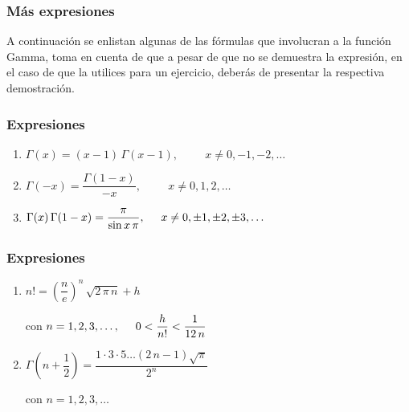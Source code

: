 \documentclass[12pt]{beamer}
\begin{document}
\begin{frame}
\frametitle{Más expresiones}
A continuación se enlistan algunas de las fórmulas que involucran a la función Gamma, \pause toma en cuenta de que a pesar de que no se demuestra la expresión, en el caso de que la utilices para un ejercicio, deberás de presentar la respectiva demostración.
\end{frame}
\begin{frame}
\frametitle{Expresiones}
{%
\begin{enumerate}[<+->]
  \setlength{\itemsep}{1em}
  \item $\Gamma (x) = (x - 1) \, \Gamma(x - 1), \hspace{1cm} x \neq 0, -1, -2, \ldots$ 
  \item $\Gamma (-x) = \dfrac{\Gamma (1- x)}{-x}, \hspace{1cm} x \neq 0, 1, 2, \ldots$
  \item $\Gamma (x) \, \Gamma (1 - x) = \dfrac{\pi}{\sin x \, \pi}, \hspace{0.5cm}  x \neq 0, \pm 1, \pm 2, \pm 3, \ldots$
\seti
\end{enumerate}
}
\end{frame}
\begin{frame}
\frametitle{Expresiones}
{%
\begin{enumerate}[<+->]
  \setlength{\itemsep}{1em}
  \conti
  \item $n! = \left( \dfrac{n}{e} \right)^{n} \, \sqrt{2 \, \pi \, n} + h$
  
  con $n = 1, 2, 3, \ldots, \hspace{0.5cm} 0 < \dfrac{h}{n!} < \dfrac{1}{12 \, n}$
  \item $\Gamma \left(n + \dfrac{1}{2} \right) = \dfrac{1 \cdot 3 \cdot 5 \ldots (2 \, n - 1)\sqrt{\pi}}{2^{n}}$
  
  \vspace{0.5cm}
  con $n = 1, 2, 3, \ldots$
\seti
\end{enumerate}
}
\end{frame}
\end{document}
